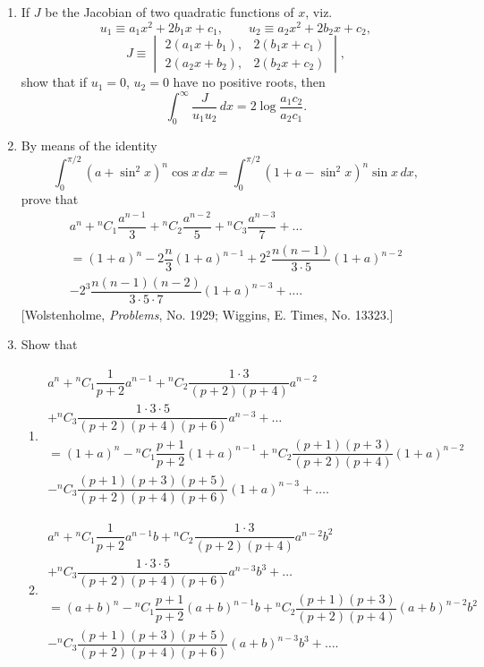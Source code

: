 \documentclass[11pt, a4paper]{article}
\newcommand{\source}[1]{\hfill\textnormal{[#1]}}
\begin{document}
\begin{enumerate}[leftmargin=2em]
\item If $J$ be the Jacobian of two quadratic functions of $x$, viz.
\[
u_1\equiv a_1x^2+2b_1x+c_1, \qquad u_2\equiv a_2x^2+2b_2x+c_2,
\]
\[
J\equiv\begin{vmatrix} 2(a_1x+b_1), & 2(b_1x+c_1) \\ 2(a_2x+b_2), & 2(b_2x+c_2) \end{vmatrix},
\]
show that if $u_1=0$, $u_2=0$ have no positive roots, then
\[
\int_0^\infty \dfrac{J}{u_1u_2}\,dx=2\log\dfrac{a_1c_2}{a_2c_1}.
\]

\item By means of the identity
\[
\int_0^{\pi/2}(a+\sin^2x)^n\cos x\,dx=\int_0^{\pi/2}(1+a-\sin^2x)^n\sin x\,dx,
\]
prove that
\begin{multline*}
a^n+{}^nC_1\dfrac{a^{n-1}}{3}+{}^nC_2\dfrac{a^{n-2}}{5}+{}^nC_3\dfrac{a^{n-3}}{7}+\dots\\
=(1+a)^n-2\dfrac{n}{3}(1+a)^{n-1}+2^2\dfrac{n(n-1)}{3\cdot5}(1+a)^{n-2}\\
-2^3\dfrac{n(n-1)(n-2)}{3\cdot5\cdot7}(1+a)^{n-3}+\dots.
\end{multline*}
\source{Wolstenholme, \textit{Problems}, No. 1929; Wiggins, E. Times, No. 13323.}

\item Show that
\begin{enumerate}[label=(\roman*)]
\item
\begin{multline*}
a^n+{}^nC_1\dfrac{1}{p+2}a^{n-1}+{}^nC_2\dfrac{1\cdot3}{(p+2)(p+4)}a^{n-2}\\
+{}^nC_3\dfrac{1\cdot3\cdot5}{(p+2)(p+4)(p+6)}a^{n-3}+\dots\\
=(1+a)^n-{}^nC_1\dfrac{p+1}{p+2}(1+a)^{n-1}+{}^nC_2\dfrac{(p+1)(p+3)}{(p+2)(p+4)}(1+a)^{n-2}\\
-{}^nC_3\dfrac{(p+1)(p+3)(p+5)}{(p+2)(p+4)(p+6)}(1+a)^{n-3}+\dots.
\end{multline*}
\item
\begin{multline*}
a^n+{}^nC_1\dfrac{1}{p+2}a^{n-1}b+{}^nC_2\dfrac{1\cdot3}{(p+2)(p+4)}a^{n-2}b^2\\
+{}^nC_3\dfrac{1\cdot3\cdot5}{(p+2)(p+4)(p+6)}a^{n-3}b^3+\dots\\
=(a+b)^n-{}^nC_1\dfrac{p+1}{p+2}(a+b)^{n-1}b+{}^nC_2\dfrac{(p+1)(p+3)}{(p+2)(p+4)}(a+b)^{n-2}b^2\\
-{}^nC_3\dfrac{(p+1)(p+3)(p+5)}{(p+2)(p+4)(p+6)}(a+b)^{n-3}b^3+\dots.
\end{multline*}
\end{enumerate}


\end{enumerate}
\end{document}
